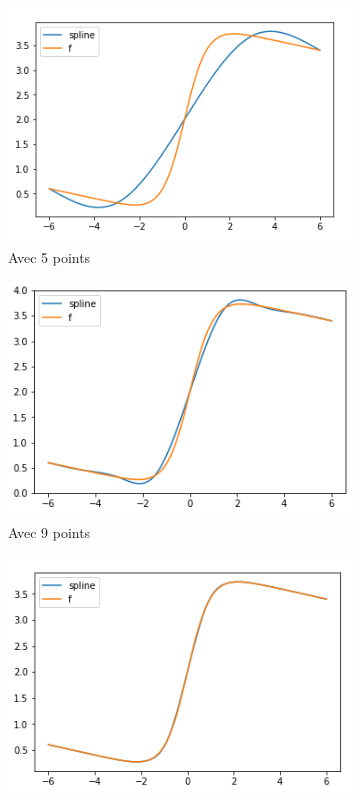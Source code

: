 \begin{figure}[h]
  \centering
  \begin{subfigure}[b]{0.4\linewidth}
    \includegraphics[width=\linewidth]{fig5}
    \caption{Avec 5 points}
  \end{subfigure}
  \begin{subfigure}[b]{0.4\linewidth}
    \includegraphics[width=\linewidth]{fig6}
    \caption{Avec 9 points}
  \end{subfigure}
  \begin{subfigure}[b]{0.4\linewidth}
    \includegraphics[width=\linewidth]{fig7}

\end{subfigure}
\end{figure}
